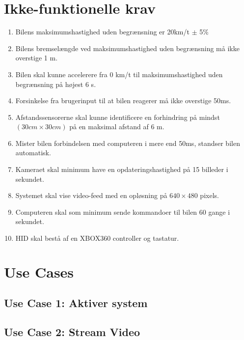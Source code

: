 \section{Ikke-funktionelle krav}
\begin{enumerate}
	\item Bilens maksimumshastighed uden begrænsning er 20km/t $\pm$ 5\% %
	\item Bilens bremselængde ved maksimumshastighed uden begrænsning må ikke overstige 1 m. %
	\item Bilen skal kunne accelerere fra 0 km/t til maksimumshastighed uden begrænsning på højest 6 s. %
	\item Forsinkelse fra brugerinput til at bilen reagerer må ikke overstige 50ms. %
	\item Afstandssensorerne skal kunne identificere en forhindring på mindst $(30cm \times 30cm)$ på en maksimal afstand af 6 m. %
	\item Mister bilen forbindelsen med computeren i mere end 50ms, standser bilen automatisk. 
	\item Kameraet skal minimum have en opdateringshastighed på 15 billeder i sekundet. %
	\item Systemet skal vise video-feed med en opløsning på $640 \times 480$ pixels.
	\item Computeren skal som minimum sende kommandoer til bilen 60 gange i sekundet. 
	\item HID skal bestå af en XBOX360 controller og tastatur.
\end{enumerate}

\newpage
\section{Use Cases}



\newpage
\subsection{Use Case 1: Aktiver system}


\newpage
\subsection{Use Case 2: Stream Video}


